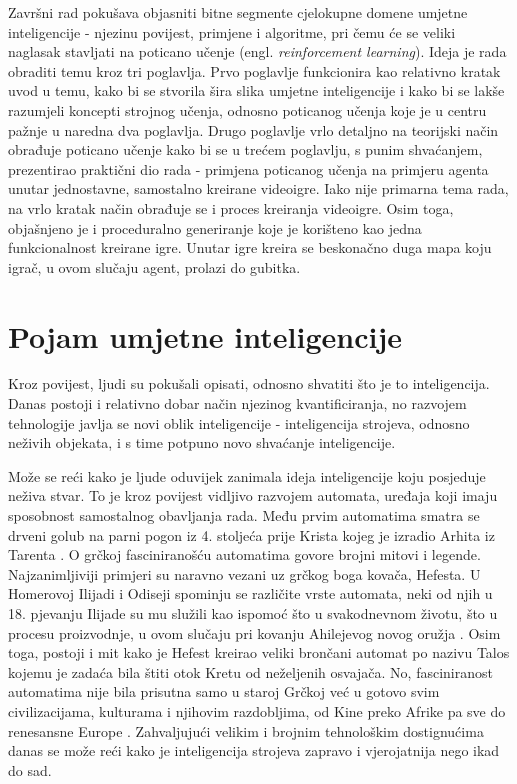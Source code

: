 \documentclass[]{foi} %
\begin{document}
Završni rad pokušava objasniti bitne segmente cjelokupne domene umjetne inteligencije - njezinu povijest, primjene i algoritme, pri čemu će se veliki naglasak stavljati na poticano učenje (engl. \textit{reinforcement learning}). Ideja je rada obraditi temu kroz tri poglavlja. Prvo poglavlje funkcionira kao relativno kratak uvod u temu, kako bi se stvorila šira slika umjetne inteligencije i kako bi se lakše razumjeli koncepti strojnog učenja, odnosno poticanog učenja koje je u centru pažnje u naredna dva poglavlja. Drugo poglavlje vrlo detaljno na teorijski način obrađuje poticano učenje kako bi se u trećem poglavlju, s punim shvaćanjem, prezentirao praktični dio rada - primjena poticanog učenja na primjeru agenta unutar jednostavne, samostalno kreirane videoigre. Iako nije primarna tema rada, na vrlo kratak način obrađuje se i proces kreiranja videoigre. Osim toga, objašnjeno je i proceduralno generiranje koje je korišteno kao jedna funkcionalnost kreirane igre. Unutar igre kreira se beskonačno duga mapa koju igrač, u ovom slučaju agent, prolazi do gubitka.


\chapter{Pojam umjetne inteligencije}
\label{cha:2.poglavlje}
Kroz povijest, ljudi su pokušali opisati, odnosno shvatiti što je to inteligencija. Danas postoji i relativno dobar način njezinog kvantificiranja, no razvojem tehnologije javlja se novi oblik inteligencije - inteligencija strojeva, odnosno neživih objekata, i s time potpuno novo shvaćanje inteligencije. 

Može se reći kako je ljude oduvijek zanimala ideja inteligencije koju posjeduje neživa stvar. To je kroz povijest vidljivo razvojem automata, uređaja koji imaju sposobnost samostalnog obavljanja rada. Među prvim automatima smatra se drveni golub na parni pogon iz 4. stoljeća prije Krista kojeg je izradio Arhita iz Tarenta \cite{AutomatonBrit}. O grčkoj fasciniranošću automatima govore brojni mitovi i legende. Najzanimljiviji primjeri su naravno vezani uz grčkog boga kovača, Hefesta. U Homerovoj Ilijadi i Odiseji spominju se različite vrste automata, neki od njih u 18. pjevanju Ilijade su mu služili kao ispomoć što u svakodnevnom životu, što u procesu proizvodnje, u ovom slučaju pri kovanju Ahilejevog novog oružja \cite[18. pjevanje: 372-377, 468-473]{IlijadaSkole}. Osim toga, postoji i mit kako je Hefest kreirao veliki brončani automat po nazivu Talos kojemu je zadaća bila štiti otok Kretu od neželjenih osvajača. No, fasciniranost automatima nije bila prisutna samo u staroj Grčkoj već u gotovo svim civilizacijama,  kulturama i njihovim razdobljima, od Kine preko Afrike pa sve do renesansne Europe \cite{AutomatonBrit}. Zahvaljujući velikim i brojnim tehnološkim dostignućima danas se može reći kako je inteligencija strojeva zapravo i vjerojatnija nego ikad do sad.
\end{document}
